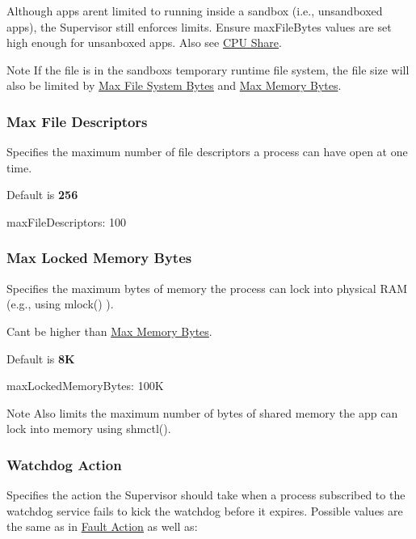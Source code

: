 Although apps aren\textquotesingle{}t limited to running inside a sandbox (i.\+e., unsandboxed apps), the Supervisor still enforces limits. Ensure {\ttfamily max\+File\+Bytes} values are set high enough for unsanboxed apps. Also see \hyperlink{def_files_adef_defFilesAdef_cpuShare}{C\+P\+U Share}.

\begin{DoxyNote}{Note}
If the file is in the sandbox\textquotesingle{}s temporary runtime file system, the file size will also be limited by \hyperlink{def_files_adef_defFilesAdef_maxFileSystemBytes}{Max File System Bytes} and \hyperlink{def_files_adef_defFilesAdef_maxMemoryBytes}{Max Memory Bytes}. ~\newline

\end{DoxyNote}
\hypertarget{def_files_adef_defFilesAdef_processMaxFileDescriptors}{}\subsubsection{Max File Descriptors}\label{def_files_adef_defFilesAdef_processMaxFileDescriptors}
Specifies the maximum number of file descriptors a process can have open at one time.

Default is {\bfseries 256} 


\begin{DoxyCode}
maxFileDescriptors: 100
\end{DoxyCode}
\hypertarget{def_files_adef_defFilesAdef_processMaxLockedMemoryBytes}{}\subsubsection{Max Locked Memory Bytes}\label{def_files_adef_defFilesAdef_processMaxLockedMemoryBytes}
Specifies the maximum bytes of memory the process can lock into physical R\+A\+M (e.\+g., using {\ttfamily mlock()} ).

Can\textquotesingle{}t be higher than \hyperlink{def_files_adef_defFilesAdef_maxMemoryBytes}{Max Memory Bytes}.

Default is {\bfseries 8\+K} 


\begin{DoxyCode}
maxLockedMemoryBytes: 100K
\end{DoxyCode}


\begin{DoxyNote}{Note}
Also limits the maximum number of bytes of shared memory the app can lock into memory using {\ttfamily shmctl()}.
\end{DoxyNote}
\hypertarget{def_files_adef_defFilesAdef_processWatchdogAction}{}\subsubsection{Watchdog Action}\label{def_files_adef_defFilesAdef_processWatchdogAction}
Specifies the action the Supervisor should take when a process subscribed to the watchdog service fails to kick the watchdog before it expires. Possible values are the same as in \hyperlink{def_files_adef_defFilesAdef_processFaultAction}{Fault Action} as well as\+:

